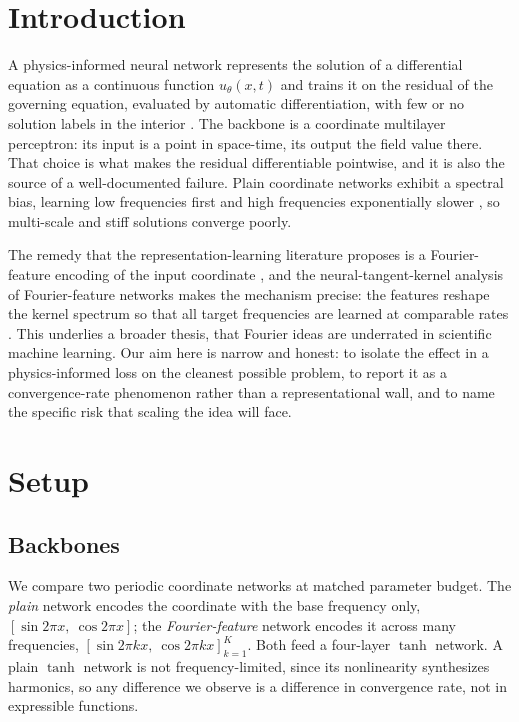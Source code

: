 \documentclass[conference]{IEEEtran}
\begin{document}
\section{Introduction}
A physics-informed neural network represents the solution of a differential equation as a continuous function $u_\theta(x,t)$ and trains it on the residual of the governing equation, evaluated by automatic differentiation, with few or no solution labels in the interior \cite{raissi2019pinn}. The backbone is a coordinate multilayer perceptron: its input is a point in space-time, its output the field value there. That choice is what makes the residual differentiable pointwise, and it is also the source of a well-documented failure. Plain coordinate networks exhibit a spectral bias, learning low frequencies first and high frequencies exponentially slower \cite{rahaman2019}, so multi-scale and stiff solutions converge poorly.

The remedy that the representation-learning literature proposes is a Fourier-feature encoding of the input coordinate \cite{tancik2020}, and the neural-tangent-kernel analysis of Fourier-feature networks makes the mechanism precise: the features reshape the kernel spectrum so that all target frequencies are learned at comparable rates \cite{wang2021eigenvector}. This underlies a broader thesis, that Fourier ideas are underrated in scientific machine learning. Our aim here is narrow and honest: to isolate the effect in a physics-informed loss on the cleanest possible problem, to report it as a convergence-rate phenomenon rather than a representational wall, and to name the specific risk that scaling the idea will face.

\section{Setup}
\subsection{Backbones}
We compare two periodic coordinate networks at matched parameter budget. The \emph{plain} network encodes the coordinate with the base frequency only, $[\sin 2\pi x,\ \cos 2\pi x]$; the \emph{Fourier-feature} network encodes it across many frequencies, $[\sin 2\pi k x,\ \cos 2\pi k x]_{k=1}^{K}$. Both feed a four-layer $\tanh$ network. A plain $\tanh$ network is not frequency-limited, since its nonlinearity synthesizes harmonics, so any difference we observe is a difference in convergence rate, not in expressible functions.
\end{document}
